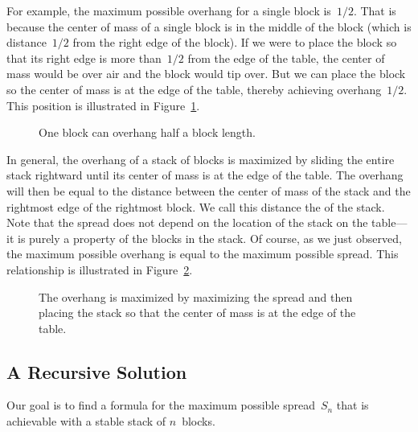 For example, the maximum possible overhang for a single block
is~$1/2$.  That is because the center of mass of a single block is in
the middle of the block (which is distance~$1/2$ from the right edge
of the block).  If we were to place the block so that its right edge
is more than~$1/2$ from the edge of the table, the center of mass
would be over air and the block would tip over.  But we can place the
block so the center of mass is at the edge of the table, thereby
achieving overhang~$1/2$.  This position is illustrated in
Figure~\ref{fig:one-stable-block}.

\begin{figure}


\caption{One block can overhang half a block length.}

\label{fig:one-stable-block}

\end{figure}

In general, the overhang of a stack of blocks is maximized by sliding
the entire stack rightward until its center of mass is at the edge of
the table.  The overhang will then be equal to the distance between
the center of mass of the stack and the rightmost edge of the
rightmost block.  We call this distance the  of the
stack.  Note that the spread does not depend on the location of the
stack on the table---it is purely a property of the blocks in the
stack.  Of course, as we just observed, the maximum possible overhang
is equal to the maximum possible spread.  This relationship is
illustrated in Figure~\ref{fig:overhang}.

\begin{figure}


\caption{The overhang is maximized by maximizing the spread and then
  placing the stack so that the center of mass is at the edge of the
  table.}

\label{fig:overhang}

\end{figure}

\subsection{A Recursive Solution}

Our goal is to find a formula for the maximum possible spread~$S_n$
that is achievable with a stable stack of $n$~blocks.

